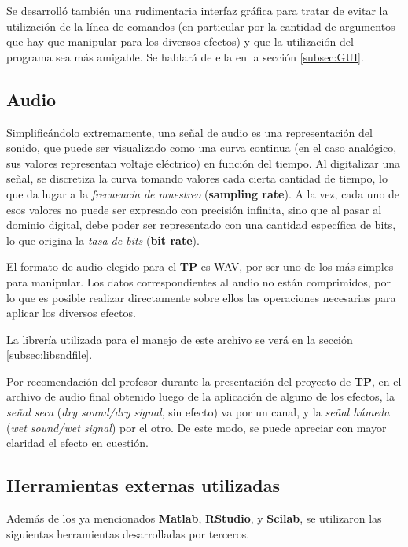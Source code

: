 \documentclass[a4paper,spanish,12pt]{article}
\begin{document}
Se desarrolló también una rudimentaria interfaz gráfica para tratar de evitar la utilización de la línea de comandos (en particular por la cantidad de argumentos que hay que manipular para los diversos efectos) y que la utilización del programa sea más amigable. Se hablará de ella en la sección \ref{subsec:GUI}.

\subsection{Audio}
\label{subsec:audio}
Simplificándolo extremamente, una señal de audio es una representación del sonido, que puede ser visualizado como una curva continua (en el caso analógico, sus valores representan voltaje eléctrico) en función del tiempo. Al digitalizar una señal, se discretiza la curva tomando valores cada cierta cantidad de tiempo, lo que da lugar a la \textit{frecuencia de muestreo} (\textbf{sampling rate}). A la vez, cada uno de esos valores no puede ser expresado con precisión infinita, sino que al pasar al dominio digital, debe poder ser representado con una cantidad específica de bits, lo que origina la \textit{tasa de bits} (\textbf{bit rate}). \vspace{\baselineskip}

El formato de audio elegido para el \textbf{TP} es WAV, por ser uno de los más simples para manipular. Los datos correspondientes al audio no están comprimidos, por lo que es posible realizar directamente sobre ellos las operaciones necesarias para aplicar los diversos efectos. 

La librería utilizada para el manejo de este archivo se verá en la sección \ref{subsec:libsndfile}.

Por recomendación del profesor durante la presentación del proyecto de \textbf{TP}, en el archivo de audio final obtenido luego de la aplicación de alguno de los efectos, la \textit{señal seca} (\textit{dry sound/dry signal}, sin efecto) va por un canal, y la \textit{señal húmeda} (\textit{wet sound/wet signal}) por el otro. De este modo, se puede apreciar con mayor claridad el efecto en cuestión.

\subsection{Herramientas externas utilizadas}
\label{subsec:herramientas}
Además de los ya mencionados \textbf{Matlab}, \textbf{RStudio}, y \textbf{Scilab}, se utilizaron las siguientas herramientas desarrolladas por terceros.
\end{document}
